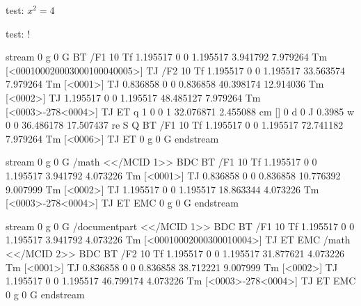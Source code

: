  test: $x^2 = 4$

\blank[2*big]

 test:  !

\page



\starttyping[style=\ttxx\setupinterlinespace]
stream
0 g 0 G
BT
/F1 10 Tf
1.195517 0 0 1.195517 3.941792 7.979264 Tm [<000100020003000100040005>] TJ
/F2 10 Tf
1.195517 0 0 1.195517 33.563574 7.979264 Tm [<0001>] TJ
0.836858 0 0 0.836858 40.398174 12.914036 Tm [<0002>] TJ
1.195517 0 0 1.195517 48.485127 7.979264 Tm [<0003>-278<0004>] TJ
ET
q
1 0 0 1 32.076871 2.455088 cm
[] 0 d 0 J 0.3985 w 0 0 36.486178 17.507437 re S
Q
BT
/F1 10 Tf
1.195517 0 0 1.195517 72.741182 7.979264 Tm [<0006>] TJ
ET
0 g 0 G
endstream
\stoptyping


\page


\starttyping[style=\ttxx\setupinterlinespace]
stream
0 g 0 G
/math <</MCID 1>> BDC
BT
/F1 10 Tf
1.195517 0 0 1.195517 3.941792 4.073226 Tm [<0001>] TJ
0.836858 0 0 0.836858 10.776392 9.007999 Tm [<0002>] TJ
1.195517 0 0 1.195517 18.863344 4.073226 Tm [<0003>-278<0004>] TJ
ET
EMC
0 g 0 G
endstream
\stoptyping


\page


\starttyping[style=\ttxx\setupinterlinespace]
stream
0 g 0 G
/documentpart <</MCID 1>> BDC
BT
/F1 10 Tf
1.195517 0 0 1.195517 3.941792 4.073226 Tm [<00010002000300010004>] TJ
ET
EMC
/math <</MCID 2>> BDC
BT
/F2 10 Tf
1.195517 0 0 1.195517 31.877621 4.073226 Tm [<0001>] TJ
0.836858 0 0 0.836858 38.712221 9.007999 Tm [<0002>] TJ
1.195517 0 0 1.195517 46.799174 4.073226 Tm [<0003>-278<0004>] TJ
ET
EMC
0 g 0 G
endstream
\stoptyping


\page


